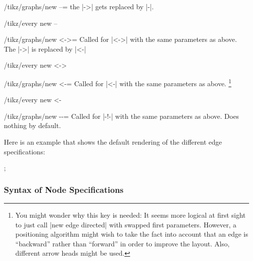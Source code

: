 \begin{enumerate}
\begin{key}{/tikz/graphs/new --=}
            the |->| gets replaced by |-|.
            \begin{stylekey}{/tikz/every new --}
            \end{stylekey}
        \end{key}
        \begin{key}{/tikz/graphs/new <->=}
            Called for |<->| with the same parameters as above. The |->| is
            replaced by |<-|
            \begin{stylekey}{/tikz/every new <->}
            \end{stylekey}
        \end{key}
        \begin{key}{/tikz/graphs/new <-=}
            Called for |<-| with the same parameters as above.%
            \footnote{%
                You might wonder why this key is needed: It seems more logical
                at first sight to just call |new edge directed| with swapped
                first parameters. However, a positioning algorithm might wish
                to take the fact into account that an edge is ``backward''
                rather than ``forward'' in order to improve the layout. Also,
                different arrow heads might be used.
            }
            \begin{stylekey}{/tikz/every new <-}
            \end{stylekey}
        \end{key}
        \begin{key}{/tikz/graphs/new -\protect\exclamationmarktext-=}
            Called for |-!-| with the same parameters as above. Does nothing by
            default.
        \end{key}
\end{enumerate}

Here is an example that shows the default rendering of the different edge
specifications:
%
\begin{codeexample}[]
\tikz {};
\end{codeexample}


\subsubsection{Syntax of Node Specifications}
\label{section-library-graphs-node-spec}

